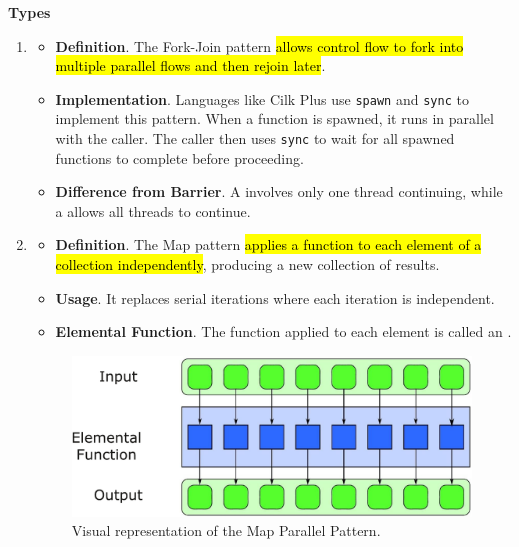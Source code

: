 \highspace
\begin{flushleft}
    \textcolor{Green3}{ \textbf{Types}}
\end{flushleft}
\begin{enumerate}
    \item {}
    \begin{itemize}
        \item[\textcolor{Red2}{\faIcon{book}}] \textcolor{Red2}{\textbf{Definition}}. The Fork-Join pattern \hl{allows control flow to fork into multiple parallel flows and then rejoin later}.

        \item[\textcolor{Green3}{\faIcon{tools}}] \textcolor{Green3}{\textbf{Implementation}}. Languages like Cilk Plus use \texttt{spawn} and \texttt{sync} to implement this pattern. When a function is spawned, it runs in parallel with the caller. The caller then uses \texttt{sync} to wait for all spawned functions to complete before proceeding.

        \item[\textcolor{Green3}{\faIcon{not-equal}}] \textcolor{Green3}{\textbf{Difference from Barrier}}. A  involves only one thread continuing, while a  allows all threads to continue.
    \end{itemize}


    \item {}
    \begin{itemize}
        \item[\textcolor{Red2}{\faIcon{book}}] \textcolor{Red2}{\textbf{Definition}}. The Map pattern \hl{applies a function to each element of a collection independently}, producing a new collection of results.

        \item[\textcolor{Green3}{\faIcon{tools}}] \textcolor{Green3}{\textbf{Usage}}. It replaces serial iterations where each iteration is independent.

        \item[\textcolor{Green3}{\faIcon{bookmark}}] \textcolor{Green3}{\textbf{Elemental Function}}. The function applied to each element is called an .
    \end{itemize}
    \begin{figure}[!htp]
        \centering
        \includegraphics[width=.7\textwidth]{img/map-pattern-1.pdf}
        \caption{Visual representation of the Map Parallel Pattern.}
    \end{figure}


\end{enumerate}
